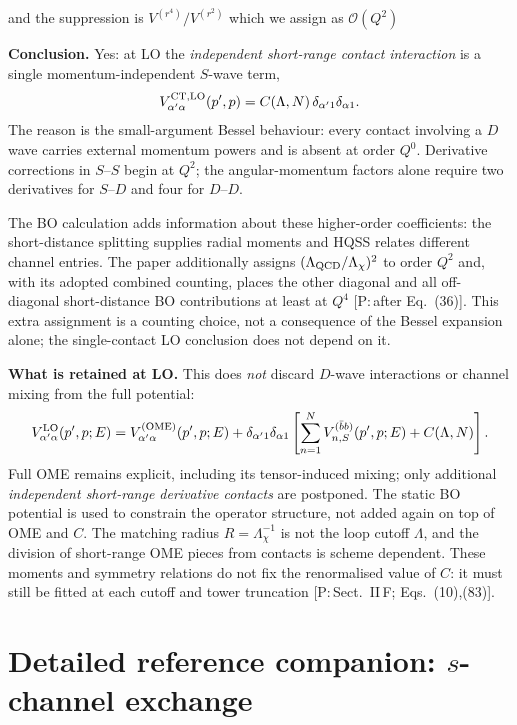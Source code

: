 \documentclass[11pt,a4paper]{article}
\newcommand{\tagP}[1]{\textcolor{blue!65!black}{\textsf{\small[P:\,#1]}}}
\renewcommand{\VQQ}{V^{(\bar bb)}}
\renewcommand{\VOME}{V^{\rm (OME)}}
\newenvironment{aiadd}{\par}{\par}
\begin{document}
and the suppression is $V^{(r^4)}/V^{(r^2)}$ which we assign as $\mathcal{O}(Q^2)$
\begin{aiadd}
	\textbf{Conclusion.} Yes: at LO the \emph{independent short-range
	contact interaction} is a single momentum-independent $S$-wave term,
	\begin{equation}
		V^{\rm CT,LO}_{\alpha'\alpha}(p',p)
		=C(\Lambda,N)\,\delta_{\alpha'1}\delta_{\alpha1}.
		\label{eq:pc-lo-contact}
	\end{equation}
	The reason is the small-argument Bessel behaviour: every contact
	involving a $D$ wave carries external momentum powers and is absent
	at order $Q^0$. Derivative corrections in $S$--$S$ begin at $Q^2$;
	the angular-momentum factors alone require two derivatives for
	$S$--$D$ and four for $D$--$D$.

	The BO calculation adds information about these higher-order
	coefficients: the short-distance splitting supplies radial moments
	and HQSS relates different channel entries. The paper additionally
	assigns $(\Lambda_{\rm QCD}/\Lambda_\chi)^2$ to order $Q^2$ and,
	with its adopted combined counting, places the other diagonal and
	all off-diagonal short-distance BO contributions at least at $Q^4$
	\tagP{after Eq.~(36)}. This extra assignment is a counting choice,
	not a consequence of the Bessel expansion alone; the single-contact
	LO conclusion does not depend on it.

	\textbf{What is retained at LO.} This does \emph{not} discard
	$D$-wave interactions or channel mixing from the full potential:
	\[
		V^{\rm LO}_{\alpha'\alpha}(p',p;E)
		=\VOME_{\alpha'\alpha}(p',p;E)
		+\delta_{\alpha'1}\delta_{\alpha1}
		\left[\sum_{n=1}^{N}\VQQ_{n,S}(p',p;E)+C(\Lambda,N)\right].
	\]
	Full OME remains explicit, including its tensor-induced mixing;
	only additional \emph{independent short-range derivative contacts}
	are postponed. The static BO potential is used to constrain the
	operator structure, not added again on top of OME and $C$.
	The matching radius $R=\Lambda_\chi^{-1}$ is not the loop cutoff
	$\Lambda$, and the division of short-range OME pieces from contacts
	is scheme dependent. These moments and symmetry relations do not
	fix the renormalised value of $C$: it must still be fitted at each
	cutoff and tower truncation \tagP{Sect.~II\,F; Eqs.~(10),(83)}.
\end{aiadd}


\clearpage
\part{Detailed reference companion: \texorpdfstring{$s$}{s}-channel exchange}
\label{part:reference}
\end{document}
